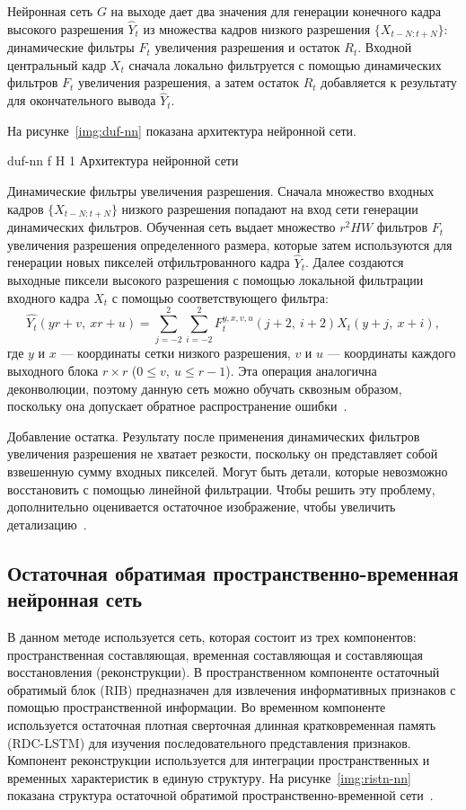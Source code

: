 \documentclass{bmstu}
\begin{document}
Нейронная сеть $G$ на выходе дает два значения для генерации конечного кадра высокого разрешения $\hat{Y}_t$ из множества кадров низкого разрешения $\{X_{t - N:t + N}\}$: динамические фильтры $F_t$ увеличения разрешения и остаток $R_t$. 
Входной центральный кадр $X_t$ сначала локально фильтруется с помощью динамических фильтров $F_t$ увеличения разрешения, а затем остаток $R_t$ добавляется к результату для окончательного вывода $\hat{Y}_t$.

На рисунке~\ref{img:duf-nn} показана архитектура нейронной сети. 

    {duf-nn}
    {f}
    {H}
    {1\textwidth}
    {Архитектура нейронной сети~\cite{Younghyun2018}}
    
Динамические фильтры увеличения разрешения. 
Сначала множество входных кадров $\{X_{t - N:t + N}\}$ низкого разрешения попадают на вход сети генерации динамических фильтров. 
Обученная сеть выдает множество $r^{2}HW$ фильтров $F_t$ увеличения разрешения определенного размера, которые затем используются для генерации новых пикселей отфильтрованного кадра $\hat{Y}_t$. 
Далее создаются выходные пиксели высокого разрешения с помощью локальной фильтрации входного кадра $X_t$ с помощью соответствующего фильтра:
\begin{equation}
\hat{Y_t}(yr + v,~xr + u) = \sum_{j = -2}^{2} \sum_{i = -2}^{2} F^{y,x,v,u}_{t}(j + 2,~i + 2)X_{t}(y + j,~x + i),
\end{equation}
где $y$ и $x$ --- координаты сетки низкого разрешения, $v$ и $u$ --- координаты каждого выходного блока $r \times r$ ($0 \leq v,~u \leq r - 1$). 
Эта операция аналогична деконволюции, поэтому данную сеть можно обучать сквозным образом, поскольку она допускает обратное распространение ошибки~\cite{Younghyun2018}.

Добавление остатка. 
Результату после применения динамических фильтров увеличения разрешения не хватает резкости, поскольку он представляет собой взвешенную сумму входных пикселей. 
Могут быть детали, которые невозможно восстановить с помощью линейной фильтрации. 
Чтобы решить эту проблему, дополнительно оценивается остаточное изображение, чтобы увеличить детализацию~\cite{Younghyun2018}.

\subsection{Остаточная обратимая пространственно-временная нейронная сеть}

В данном методе используется сеть, которая состоит из трех компонентов: пространственная составляющая, временная составляющая и составляющая восстановления (реконструкции). 
В пространственном компоненте остаточный обратимый блок (RIB) предназначен для извлечения информативных признаков с помощью пространственной информации. 
Во временном компоненте используется остаточная плотная сверточная длинная кратковременная память (RDC-LSTM) для изучения последовательного представления признаков. 
Компонент реконструкции используется для интеграции пространственных и временных характеристик в единую структуру. 
На рисунке~\ref{img:ristn-nn} показана структура остаточной обратимой пространственно-временной сети~\cite{Xiaobin2019}.
\end{document}
